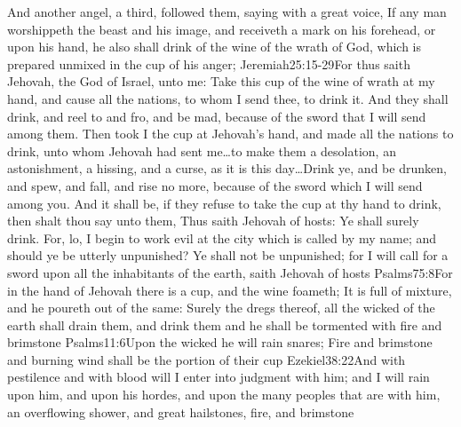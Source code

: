 And another angel, a third, followed them, saying with a great voice, If any man worshippeth the beast and his image, and receiveth a mark on his forehead, or upon his hand, 
he also shall drink of the wine of the wrath of God, which is prepared unmixed in the cup of his anger;%
				   {Jeremiah}{25:15-29}{For thus saith Jehovah, the God of Israel, unto me: Take this cup of the wine of wrath at my hand, and cause all the nations, to whom I send thee, to drink it. And they shall drink, and reel to and fro, and be mad, because of the sword that I will send among them. Then took I the cup at Jehovah’s hand, and made all the nations to drink, unto whom Jehovah had sent me\ldots to make them a desolation, an astonishment, a hissing, and a curse, as it is this day\ldots Drink ye, and be drunken, and spew, and fall, and rise no more, because of the sword which I will send among you. And it shall be, if they refuse to take the cup at thy hand to drink, then shalt thou say unto them, Thus saith Jehovah of hosts: Ye shall surely drink. For, lo, I begin to work evil at the city which is called by my name; and should ye be utterly unpunished? Ye shall not be unpunished; for I will call for a sword upon all the inhabitants of the earth, saith Jehovah of hosts}%
				   {Psalms}{75:8}{For in the hand of Jehovah there is a cup, and the wine foameth; It is full of mixture, and he poureth out of the same: Surely the dregs thereof, all the wicked of the earth shall drain them, and drink them}
 and he shall be tormented with fire and brimstone%
					{Psalms}{11:6}{Upon the wicked he will rain snares; Fire and brimstone and burning wind shall be the portion of their cup}%
					{Ezekiel}{38:22}{And with pestilence and with blood will I enter into judgment with him; and I will rain upon him, and upon his hordes, and upon the many peoples that are with him, an overflowing shower, and great hailstones, fire, and brimstone}%
